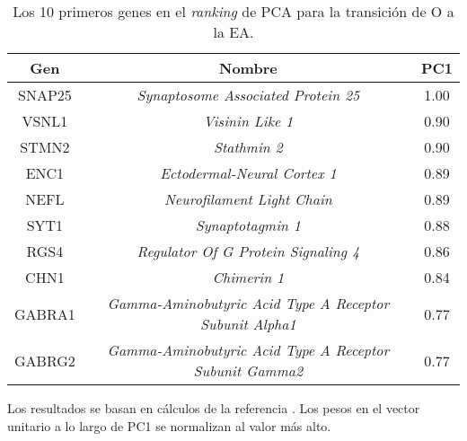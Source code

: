 
\chapter{}\label{apx:apx7}

\begin{table}[!htb]
	\centering
	\caption{Los 10 primeros genes en el \textit{ranking} de PCA para la transición de O a la EA.}
	\label{tab:apx7}
	\begin{tabular}{|c|c|c|}
		\hline
		Gen & Nombre & PC1 \\ \hline
		
		\hline
		SNAP25 & \textit{Synaptosome Associated Protein 25} & 1.00 \\
		\hline
		VSNL1 & \textit{Visinin Like 1} & 0.90 \\
		\hline
		STMN2 & \textit{Stathmin 2} & 0.90 \\
		\hline
		ENC1 & \textit{Ectodermal-Neural Cortex 1} & 0.89 \\
		\hline
		NEFL & \textit{Neurofilament Light Chain} & 0.89 \\
		\hline
		SYT1 & \textit{Synaptotagmin 1} & 0.88 \\
		\hline
		RGS4 & \textit{Regulator Of G Protein Signaling 4} & 0.86 \\
		\hline
		CHN1 & \textit{Chimerin 1} & 0.84 \\
		\hline
		GABRA1 & \textit{Gamma-Aminobutyric Acid Type A Receptor Subunit Alpha1} & 0.77 \\
		\hline
		GABRG2 & \textit{Gamma-Aminobutyric Acid Type A Receptor Subunit Gamma2} & 0.77 \\
		\hline
		
	\end{tabular}
\end{table}

Los resultados se basan en cálculos de la referencia \cite{Gonzalez_2021}. Los pesos en el vector unitario a lo largo de PC1 se normalizan al valor más alto.
